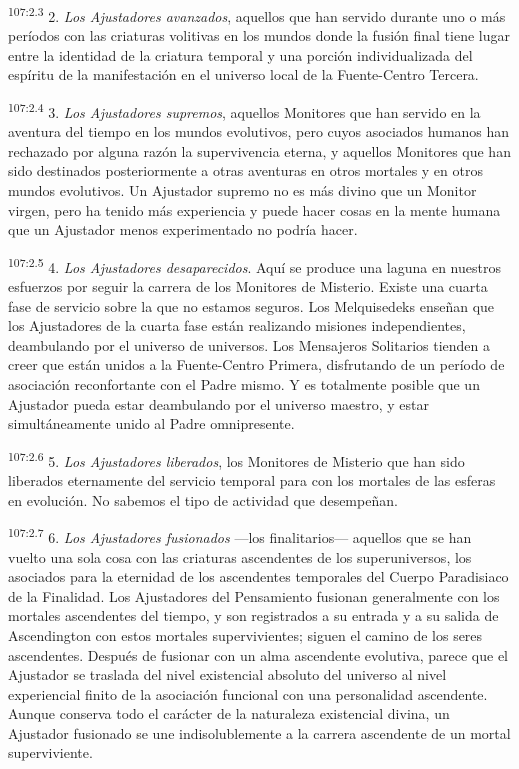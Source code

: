 \par
\textsuperscript{107:2.3} 2. \textit{Los Ajustadores avanzados}, aquellos que han servido durante uno o más períodos con las criaturas volitivas en los mundos donde la fusión final tiene lugar entre la identidad de la criatura temporal y una porción individualizada del espíritu de la manifestación en el universo local de la Fuente-Centro Tercera.

\par
\textsuperscript{107:2.4} 3. \textit{Los Ajustadores supremos}, aquellos Monitores que han servido en la aventura del tiempo en los mundos evolutivos, pero cuyos asociados humanos han rechazado por alguna razón la supervivencia eterna, y aquellos Monitores que han sido destinados posteriormente a otras aventuras en otros mortales y en otros mundos evolutivos. Un Ajustador supremo no es más divino que un Monitor virgen, pero ha tenido más experiencia y puede hacer cosas en la mente humana que un Ajustador menos experimentado no podría hacer.

\par
\textsuperscript{107:2.5} 4. \textit{Los Ajustadores desaparecidos}. Aquí se produce una laguna en nuestros esfuerzos por seguir la carrera de los Monitores de Misterio. Existe una cuarta fase de servicio sobre la que no estamos seguros. Los Melquisedeks enseñan que los Ajustadores de la cuarta fase están realizando misiones independientes, deambulando por el universo de universos. Los Mensajeros Solitarios tienden a creer que están unidos a la Fuente-Centro Primera, disfrutando de un período de asociación reconfortante con el Padre mismo. Y es totalmente posible que un Ajustador pueda estar deambulando por el universo maestro, y estar simultáneamente unido al Padre omnipresente.

\par
\textsuperscript{107:2.6} 5. \textit{Los Ajustadores liberados}, los Monitores de Misterio que han sido liberados eternamente del servicio temporal para con los mortales de las esferas en evolución. No sabemos el tipo de actividad que desempeñan.

\par
\textsuperscript{107:2.7} 6. \textit{Los Ajustadores fusionados} ---los finalitarios--- aquellos que se han vuelto una sola cosa con las criaturas ascendentes de los superuniversos, los asociados para la eternidad de los ascendentes temporales del Cuerpo Paradisiaco de la Finalidad. Los Ajustadores del Pensamiento fusionan generalmente con los mortales ascendentes del tiempo, y son registrados a su entrada y a su salida de Ascendington con estos mortales supervivientes; siguen el camino de los seres ascendentes. Después de fusionar con un alma ascendente evolutiva, parece que el Ajustador se traslada del nivel existencial absoluto del universo al nivel experiencial finito de la asociación funcional con una personalidad ascendente. Aunque conserva todo el carácter de la naturaleza existencial divina, un Ajustador fusionado se une indisolublemente a la carrera ascendente de un mortal superviviente.


